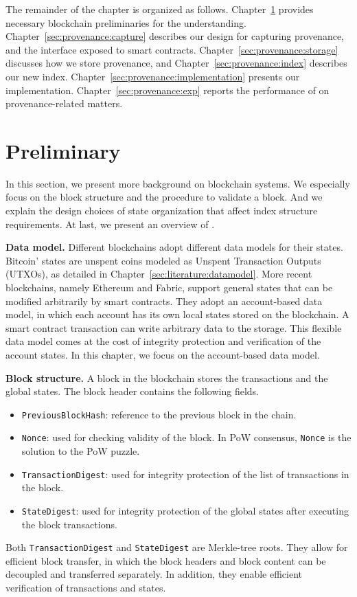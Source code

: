 The remainder of the chapter is organized as follows. Chapter~\ref{sec:provenance:background} provides necessary blockchain preliminaries for the understanding. Chapter~\ref{sec:provenance:capture} describes our design for capturing provenance, and the interface
exposed to smart contracts. Chapter~\ref{sec:provenance:storage} discusses how we store provenance, and
Chapter~\ref{sec:provenance:index} describes our new index. Chapter~\ref{sec:provenance:implementation} presents our
implementation. Chapter~\ref{sec:provenance:exp} reports the performance of {\fs} on provenance-related matters. 

\section{Preliminary}
\label{sec:provenance:background}
In this section, we present more background on blockchain systems.
We especially focus on the block structure and the procedure to validate a block. 
And we explain the design choices of state organization that affect index structure requirements.
At last, we present an overview of {\fs}. 

\textbf{Data model.} Different blockchains adopt different data models for their states. Bitcoin' states
are unspent coins modeled as Unspent Transaction Outputs (UTXOs), as detailed in Chapter~\ref{sec:literature:datamodel}. More recent blockchains, namely Ethereum and Fabric, support general states that can be modified arbitrarily
by smart contracts.  They adopt an account-based data model, in which each account has its own local states
stored on the blockchain. A smart contract transaction can write arbitrary data to the storage. This flexible
data model comes at the cost of integrity protection and verification of the account states. In this chapter, we
focus on the account-based data model.

\textbf{Block structure.} A block in the blockchain stores the transactions and the global states.
The block header contains the following fields.  
\begin{itemize} 
    \item \texttt{PreviousBlockHash}: reference to the previous block in the chain. 
    \item \texttt{Nonce}: used for checking validity of the block. In PoW consensus, \texttt{Nonce} is the solution to the PoW puzzle. 
    \item \texttt{TransactionDigest}: used for integrity protection of the list of transactions in the block. 
    \item \texttt{StateDigest}: used for integrity protection of the global states after executing the block transactions. 
\end{itemize}
Both \texttt{TransactionDigest} and \texttt{StateDigest} are Merkle-tree roots. They allow for efficient block
transfer, in which the block headers and block content can be decoupled and transferred separately. In
addition, they enable efficient verification of transactions and states.

